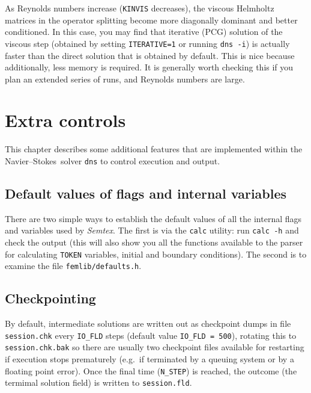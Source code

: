 \documentclass[11pt]{report}
\newcommand{\Semtex}{\emph{Semtex}} \newcommand{\Dog}{\emph{Dog}}
\newcommand{\eg}{e.g.\ } \newcommand{\CC}{\mathrm{c.c.}}
\newcommand\NavSto{Navier--Stokes}
\begin{document}
As Reynolds numbers increase (\ie \verb+KINVIS+ decreases), the
viscous Helmholtz matrices in the operator splitting become more
diagonally dominant and better conditioned. In this case, you may find
that iterative (PCG) solution of the viscous step (obtained by setting
\verb|ITERATIVE=1| or running \verb|dns -i|) is actually faster than
the direct solution that is obtained by default. This is nice because
additionally, less memory is required. It is generally worth checking
this if you plan an extended series of runs, and Reynolds numbers are
large.

\chapter{Extra controls}

This chapter describes some additional features that are implemented
within the \NavSto\ solver \verb+dns+ to control execution and
output.

\section{Default values of flags and internal variables}
\label{sec.default}

There are two simple ways to establish the default values of all the
internal flags and variables used by \Semtex. The first is via
the \verb+calc+ utility: run \verb+calc -h+ and check the output (this
will also show you all the functions available to the parser for
calculating \verb+TOKEN+ variables, initial and boundary
conditions). The second is to examine the file
\verb+femlib/defaults.h+.

\section{Checkpointing}
\label{sec.check}

By default, intermediate solutions are written out as checkpoint dumps
in file \verb+session.chk+ every \verb+IO_FLD+ steps (default value
\verb+IO_FLD = 500+), rotating this to \verb+session.chk.bak+ so there
are usually two checkpoint files available for restarting if execution
stops prematurely (\eg if terminated by a queuing system or by a
floating point error).  Once the final time (\verb+N_STEP+) is
reached, the outcome (the termimal solution field) is written to
\verb+session.fld+.
\end{document}
